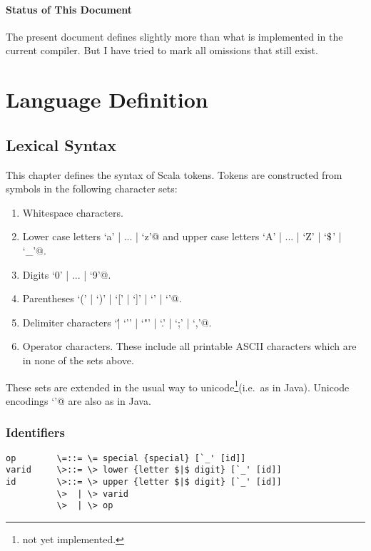 \documentclass[11pt]{report}
\newcommand{\notyet}{\footnote{not yet implemented.}}
\begin{document}

\subsection*{Status of This Document}

The present document defines slightly more than what is implemented in
the current compiler. But I have tried to mark all omissions that
still exist.

\part{Language Definition}

\chapter{Lexical Syntax}

This chapter defines the syntax of Scala tokens. Tokens are
constructed from symbols in the following character sets:
\begin{enumerate}
\item Whitespace characters.
\item Lower case letters \verb@`a' | ... | `z'@ and
upper case letters \verb@`A' | ... | `Z' | `$\Dollar$' | `_'@.
\item Digits \verb@`0' | ... | `9'@.
\item Parentheses \verb@`(' | `)' | `[' | `]' | `{' | `}'@.
\item Delimiter characters \verb@`\' | `'' | `"' | `.' | `;' | `,'@.
\item Operator characters. These include all printable ASCII characters
which are in none of the sets above.
\end{enumerate}

These sets are extended in the usual way to unicode\notyet (i.e.\ as in Java).
Unicode encodings \verb@`\uXXXX'@ are also as in Java.

\section{Identifiers}

\syntax\begin{verbatim}
op        \=::= \= special {special} [`_' [id]]
varid     \>::= \> lower {letter $|$ digit} [`_' [id]]
id        \>::= \> upper {letter $|$ digit} [`_' [id]]
          \>  | \> varid
          \>  | \> op
\end{verbatim}
\end{document}
